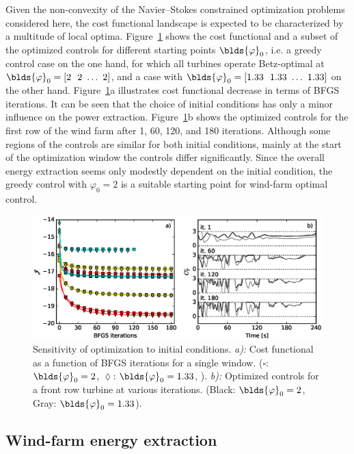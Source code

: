 Given the non-convexity of the Navier--Stokes constrained optimization problems considered here, the cost functional landscape is expected to be characterized by a multitude of local optima. Figure~\ref{fig:initial_conditions} shows the cost functional and a subset of the optimized controls for different starting points $\blds{\varphi}_0$, i.e. a greedy control case on the one hand, for which all turbines operate Betz-optimal at $\blds{\varphi}_0 = [2 \ \ 2 \ \dots \ 2]$, and a case with $\blds{\varphi}_0 = [1.33 \ \ 1.33 \ \dots \ 1.33]$ on the other hand. Figure~\ref{fig:initial_conditions}a illustrates cost functional decrease in terms of BFGS iterations. It can be seen that the choice of initial conditions has only a minor influence on the power extraction. Figure~\ref{fig:initial_conditions}b shows the optimized controls for the first row of the wind farm after 1, 60, 120, and 180 iterations. Although some regions of the controls are similar for both initial conditions, mainly at the start of the optimization window the controls differ significantly. Since the overall energy extraction seems only modestly dependent on the initial condition, the greedy control with $\varphi_0 = 2$ is a suitable starting point for wind-farm optimal control.

\begin{figure}[ht!]
	\centering
	\includegraphics[width=\linewidth]{chapters/philtrans_torque/figure13.eps}	
	\caption[Sensitivity of optimization to initial conditions.]{Sensitivity of optimization to initial conditions. \emph{a):} Cost functional as a function of BFGS iterations for a single window. ($\square$: $\blds{\varphi}_0 = 2$, $\lozenge$: $\blds{\varphi}_0 = 1.33$, \legendnoref ). \emph{b):} Optimized controls for a front row turbine at various iterations. (Black: $\blds{\varphi}_0 = 2$, Gray: $\blds{\varphi}_0 = 1.33$). \label{fig:initial_conditions}} 
\end{figure}


\subsection{Wind-farm energy extraction}\label{sec:opt_ind_energy}


